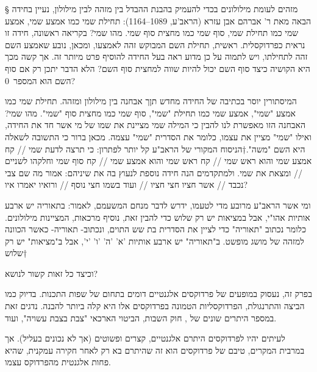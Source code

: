 \def\Title{שעשועים רקורסיביים}

§ מזהים לעומת מילולונים
      בכדי להעמיק בהבנת ההבדל בין מזהה לבין מילולון, נעיין בחידה הבאה מאת ר' אברהם
      אבן עזרא (הראב'ע, 1089–1164): תחילת שמי כמו אמצע שמי, אמצע שמי כמו תחילת שמי,
      סוף שמי כמו מחצית סוף שמי. מהו שמי? בקריאה ראשונה, חידה זו נראית כפרדוקסלית.
      ראשית, תחילת השם המבוקש זהה לאמצעו, ומכאן, נובע שאמצע השם זהה לתחילתו, ויש
      לתמוה על כן מדוע ראה בעל החידה להוסיף פרט מיותר זה. אך קשה מכך היא הקושיה כיצד
      סוף השם יכול להיות שווה למחצית סוף השם? הלא הדבר יתכן רק אם סוף השם הוא המספר~0?

      המיסתורין יוסר בכתיבה של החידה מחדש תןך אבחנה בין מילולון ומזהה. תחילת
      שמי כמו אמצע "שמי", אמצע שמי כמו תחילת "שמי", סוף שמי כמו מחצית סוף
      "שמי". מהו שמי?  האבחנה הזו מאפשרת לנו להבין כי המילה שמי מציינת את שמו
      של מי אשר חד את החידה, ואילו "שמי" מציין את עצמו, כלומר את הסדרית "שמי"
      עצמה. מכאן ברור כי התשובה לשאלה היא השם "משה".†{הניסוח המקורי של הראב"ע
      קל יותר לפתרון: כי תרצה לדעת שמי // קח אמצע שמי והוא ראש שמי // קח ראש
    שמי והוא אמצע שמי // קח סוף שמי וחלקהו לשניים // ומצאת את שמי. ולמתקדמים
  הנה חידה נוספת לנעוץ בה את שיניהם: אמור מה שם צבי נכבד // אשר חציו חצי חציו
// ועוד בשמו חצי נוסף // ורואיו יאמרו איו?}

      ומי אשר הראב"ע מרובע מדי לטעמו, ידרש לדבר מנחם המשעמם, לאמור: בתאוריה יש
      ארבע אותיות אהו"י, אבל במציאות יש רק שלוש כדי להבין זאת, נוסיף מרכאות,
      המציינות מילולונים. כלומר נכתוב "תאוריה" כדי לציין את הסדרית בת שש התוים,
      ונכתוב- תאוריה- כאשר הכוונה למזהה של מושג מופשט.  ב"תאוריה" יש ארבע
      אותיות 'א' 'ה' 'ו' 'י', אבל ב"מציאות" יש רק שלוש†{}

וכיצד כל זאות קשור לנושא?

בפרק זה, נעסוק במופעים של פרדוקסים אלגנטיים דומים בתחום של שפות התכנות. בדיוק
    כמו הביצה והתרנגולת, הפרדוקסליות הטמונה בפרדוקסים אלו היא קלה ביותר להבנה.
נדגים זאת במספר היתרים שונים של , חוק השבות, הביטוי
    הארכאי "צבת בצבת עשויה", ועוד.

לעיתים יהיו לפרדוקסים היתרם אלגנטיים, קצרים ופשוטים (אך לא נכונים בעליל). אך
    במרבית המקרים, טיבם של פרדוקסים הוא זה שהיתרם בא רק לאחר חקירה עמקנית, שהיא
    פחות אלגנטית מהפרדוקס עצמו.

